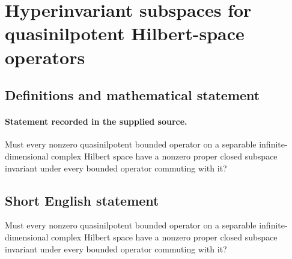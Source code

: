 \documentclass[11pt]{article}
\begin{document}
\section*{Hyperinvariant subspaces for quasinilpotent Hilbert-space operators}\label{30007310}
\subsection{Definitions and mathematical statement}
\paragraph{Statement recorded in the supplied source.}
Must every nonzero quasinilpotent bounded operator on a separable infinite-dimensional complex Hilbert space have a nonzero proper closed subspace invariant under every bounded operator commuting with it?
\subsection{Short English statement}
Must every nonzero quasinilpotent bounded operator on a separable infinite-dimensional complex Hilbert space have a nonzero proper closed subspace invariant under every bounded operator commuting with it?
\end{document}
